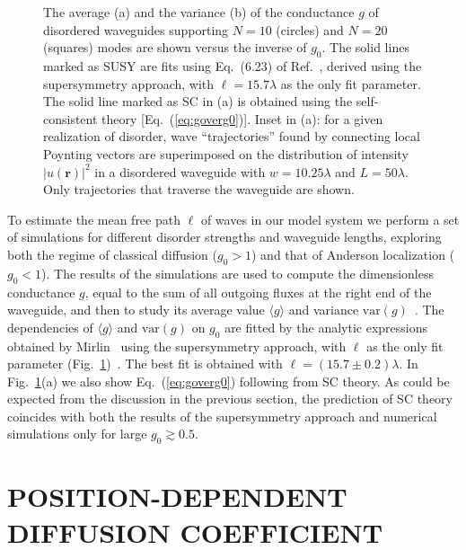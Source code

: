 \begin{figure}
\vskip -1.9in
\caption[The average (a) and the variance (b) of the conductance $g$ of disordered waveguides supporting $N=10$ (circles) 
and $N=20$ (squares) modes are shown versus the inverse of $g_0$.]{\label{fig1}
The average (a) and the variance (b) of the conductance $g$ of disordered waveguides supporting $N=10$ (circles) 
and $N=20$ (squares) modes are shown versus the inverse of $g_0$. The solid lines marked as SUSY are fits using 
Eq.~(6.23) of Ref.~\cite{2000_Mirlin}, derived using the supersymmetry approach, with $\ell = 15.7 \lambda$ as the only 
fit parameter. The solid line marked as SC in (a) is obtained using the self-consistent theory [Eq.~(\ref{eq:goverg0})]. Inset in (a): for a given realization of disorder, wave ``trajectories'' found by connecting local Poynting vectors are superimposed on the distribution of intensity $|u(\mathbf{r})|^2$ in a disordered waveguide with $w=10.25\lambda$ and $L=50\lambda$. Only trajectories that traverse the waveguide are shown.}
\end{figure}

To estimate the mean free path $\ell$ of waves in our model system we perform a set of simulations for different disorder strengths and waveguide lengths, exploring both the regime of classical diffusion ($g_0 > 1$) and that of Anderson localization ($g_0 < 1$). The results of the simulations are used to compute the dimensionless conductance $g$, equal to the sum of all outgoing fluxes at the right end of the waveguide, and then to study its average value $\langle g \rangle$ and variance $\mathrm{var}(g)$~\cite{2006_Yamilov_conductance}. The dependencies of $\langle g \rangle$ and $\mathrm{var}(g)$ on $g_0$ are fitted by the analytic expressions obtained by Mirlin~\cite{2000_Mirlin} using the supersymmetry approach, with $\ell$ as the only fit parameter (Fig.~\ref{fig1})~\cite{2010_Payne_closed}. The best fit is obtained with $\ell = (15.7\pm 0.2) \lambda$.
In Fig.~\ref{fig1}(a) we also show Eq.~(\ref{eq:goverg0}) following from SC theory. As could be expected from the discussion in the previous section, the prediction of SC theory coincides with both the results of the supersymmetry approach and numerical simulations only for large $g_0 \gtrsim 0.5$.

\section{POSITION-DEPENDENT DIFFUSION COEFFICIENT}
\label{sec:position}

